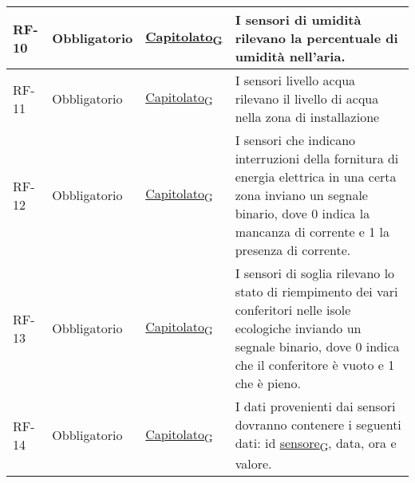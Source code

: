 \begin{longtable}{|>{\centering\arraybackslash}m{}|>{\centering\arraybackslash}m{}|>{\centering\arraybackslash}m{}|>{\centering\arraybackslash}m{}|}
	RF-10           & Obbligatorio        & \href{https://7last.github.io/docs/rtb/documentazione-interna/glossario#capitolato}{Capitolato\textsubscript{G}}     & I sensori di umidità rilevano la percentuale di umidità nell’aria.                                                                                                                                                                                                                                                 \\\hline
	RF-11           & Obbligatorio        & \href{https://7last.github.io/docs/rtb/documentazione-interna/glossario#capitolato}{Capitolato\textsubscript{G}}     & I sensori livello acqua rilevano il livello di acqua nella zona di installazione                                                                                                                                                                                                                                   \\\hline
	RF-12           & Obbligatorio        & \href{https://7last.github.io/docs/rtb/documentazione-interna/glossario#capitolato}{Capitolato\textsubscript{G}}     & I sensori che indicano interruzioni della fornitura di energia elettrica in una certa zona inviano un segnale binario, dove 0 indica la mancanza di corrente e 1 la presenza di corrente.                                                                                                                          \\\hline
	RF-13           & Obbligatorio        & \href{https://7last.github.io/docs/rtb/documentazione-interna/glossario#capitolato}{Capitolato\textsubscript{G}}     & I sensori di soglia rilevano lo stato di riempimento dei vari conferitori nelle isole ecologiche inviando un segnale binario, dove 0 indica che il conferitore è vuoto e 1 che è pieno.                                                                                                                            \\\hline
	RF-14           & Obbligatorio        & \href{https://7last.github.io/docs/rtb/documentazione-interna/glossario#capitolato}{Capitolato\textsubscript{G}}     & I dati provenienti dai sensori dovranno contenere i seguenti dati: id \href{https://7last.github.io/docs/rtb/documentazione-interna/glossario#sensore}{sensore\textsubscript{G}}, data, ora e valore.                                                                                                                                                                                                                 \\\hline

\end{longtable}
